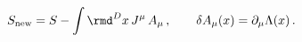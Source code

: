 \begin{equation}
  S_{\rm new}= S - \int\rmd^Dx\, J^\mu\, A_\mu \,,\qquad
  \delta A_\mu(x) =\partial _\mu \Lambda (x)\,.
 \label{SwithA}
\end{equation}

